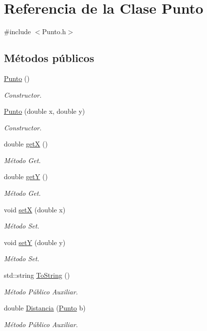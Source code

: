 \hypertarget{class_punto}{}\section{Referencia de la Clase Punto}
\label{class_punto}


{\ttfamily \#include $<$Punto.\+h$>$}

\subsection*{Métodos públicos}
\begin{DoxyCompactItemize}
\item 
\hyperlink{class_punto_a4b8b70b933ff13493ee5ddb3c8532c10}{Punto} ()
\begin{DoxyCompactList}\small\item\em Constructor. \end{DoxyCompactList}\item 
\hyperlink{class_punto_a911bb8d88eaa1f9904a27b0e159a51c0}{Punto} (double x, double y)
\begin{DoxyCompactList}\small\item\em Constructor. \end{DoxyCompactList}\item 
double \hyperlink{class_punto_af6657dca9bbda402a7ee28f460e1716d}{getX} ()
\begin{DoxyCompactList}\small\item\em Método Get. \end{DoxyCompactList}\item 
double \hyperlink{class_punto_ad6b70bca3b0ca4fc19a4796d359685b7}{getY} ()
\begin{DoxyCompactList}\small\item\em Método Get. \end{DoxyCompactList}\item 
void \hyperlink{class_punto_a9afe2951a7fe4078eecace853608b109}{setX} (double x)
\begin{DoxyCompactList}\small\item\em Método Set. \end{DoxyCompactList}\item 
void \hyperlink{class_punto_a299fda2149b242f0343772517cb40574}{setY} (double y)
\begin{DoxyCompactList}\small\item\em Método Set. \end{DoxyCompactList}\item 
std\+::string \hyperlink{class_punto_a57d2d4c38d80efce6b34397d8924d7ac}{To\+String} ()
\begin{DoxyCompactList}\small\item\em Método Público Auxiliar. \end{DoxyCompactList}\item 
double \hyperlink{class_punto_a0881575dfc445d87eb62d649764c3b1c}{Distancia} (\hyperlink{class_punto}{Punto} b)
\begin{DoxyCompactList}\small\item\em Método Público Auxiliar. \end{DoxyCompactList}\end{DoxyCompactItemize}


